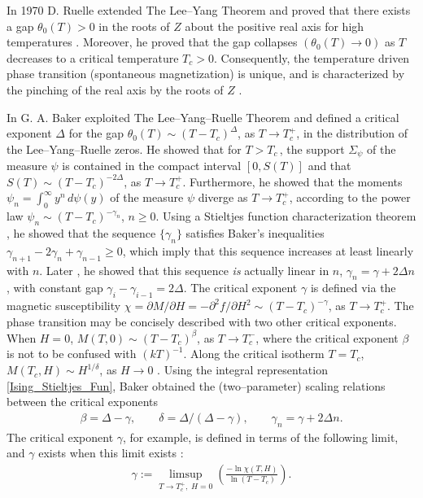 \documentclass[english,12pt,jmp,graphicx]{revtex4-1}
\begin{document}
In 1970 D. Ruelle extended The Lee--Yang Theorem and proved that
there exists a gap $\theta_0(T)>0$ in the roots of $Z$ about the positive
real axis for high temperatures \cite{Ruelle:PRL:303}. Moreover, he
proved that the gap collapses $(\theta_0(T)\to0)$ as $T$ decreases to a
critical temperature $T_c>0$. Consequently, the temperature driven
phase transition (spontaneous magnetization) is unique, and is
characterized by the pinching of the real axis by the roots of $Z$
\cite{Ruelle-1969,Ruelle:AM:589}.   

In \cite{Baker:PRB:1184,Baker-1990} G. A. Baker exploited The
Lee--Yang--Ruelle Theorem and defined a critical exponent $\Delta$ for
the gap $\theta_0(T)\sim(T-T_c)^\Delta$, as $T\to T_c^+$, in the distribution of the
Lee--Yang--Ruelle zeros. He showed that for $T>T_c\,$, the support $\Sigma_\psi$
of the measure $\psi$ is contained in the compact interval $[0,S(T)]$ and that
$S(T)\sim(T-T_c)^{-2\Delta}$, as $T\to T_c^+$. Furthermore, he showed that the moments
$\psi_n=\int_0^\infty y^n\,d\psi(y)$ of the measure $\psi$ diverge as $T\to T_c^+$, according to 
the power law $\psi_n\sim(T-T_c)^{-\gamma_n}$, $n\geq0$. Using a Stieltjes function
characterization theorem \cite{Baker-1990}, he showed that the sequence
$\{\gamma_n\}$ satisfies Baker's inequalities $\gamma_{n+1}-2\gamma_n+\gamma_{n-1}\geq0$, which
imply that this sequence increases at least linearly with $n$. Later
\cite{Baker-1990}, he showed that this sequence \emph{is} actually
linear in $n$, $\gamma_n=\gamma+2\Delta n$, with constant gap
$\gamma_i-\gamma_{i-1}=2\Delta$. The critical exponent $\gamma$ is defined via the
magnetic susceptibility $\chi=\partial M/\partial H=-\partial^2f/\partial H^2\sim(T-T_c)^{-\gamma}$, as $T\to
T_c^+$. The phase transition may be concisely described with two other
critical exponents. When $H=0$, $M(T,0)\sim(T-T_c)^\beta$, as $T\to T_c^-$,
where the critical exponent $\beta$ is not to be confused with
$(kT)^{-1}$. Along the critical isotherm $T=T_c$, $M(T_c,H)\sim H^{1/\delta}$,
as $H\to0$ \cite{Christensen-2005,Baker-1990}. Using the integral
representation \eqref{Ising_Stieltjes_Fun}, Baker obtained the
(two--parameter) scaling relations between the critical exponents
\cite{Baker-1990} 
%
\begin{align}\label{eq:Ising_Scaling_Relations}
  \beta=\Delta-\gamma, \qquad \delta=\Delta/(\Delta-\gamma), \qquad \gamma_n=\gamma+2\Delta n.
\end{align}
%
The critical exponent $\gamma$, for example, is defined
in terms of the following limit, and $\gamma$ exists when this limit exists
\cite{Baker-1990}:
% 
\begin{align}\label{eq:Critical_Exponent_Existence}
  \gamma:=\limsup_{T\to T_c^+, \;H=0}\left(\frac{-\ln \chi(T,H)}{\ln(T-T_c)}  \right).
\end{align}
%
\end{document}
